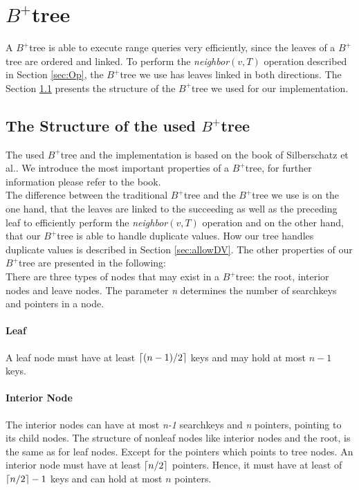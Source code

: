 \documentclass[abstracton,12pt]{scrreprt}
\DeclarePairedDelimiter\ceil{\lceil}{\rceil}
\begin{document}
\newpage
\section{$B^+$tree}
\label{sec:BplusTree}
A $B^+$tree is able to execute range queries very efficiently, since the leaves of a $B^+$tree are ordered and linked. To perform the \emph{neighbor}$(v,T)$ operation described in Section \ref{sec:Op}, the $B^+$tree we use has leaves linked in both directions. The Section \ref{structureBtree} presents the structure of the $B^+$tree we used for our implementation.

\subsection{The Structure of the used $B^+$tree}
\label{structureBtree}
The used $B^+$tree and the implementation is based on the book of Silberschatz et al.\cite{DatabaseSystemC}. We introduce the most important properties of a $B^+$tree, for further information please refer to the book.\\
The difference between the traditional $B^+$tree and the $B^+$tree we use is on the one hand, that the leaves are linked to the succeeding as well as the preceding leaf to efficiently perform the \emph{neighbor}$(v,T)$ operation and on the other hand, that our $B^+$tree is able to handle duplicate values. How our tree handles duplicate values is described in Section \ref{sec:allowDV}. The other properties of our $B^+$tree are presented in the following:\\
There are three types of nodes that may exist in a $B^+$tree: the root, interior nodes and leave nodes. The parameter \emph{n} determines the number of searchkeys and pointers in a node.

\paragraph{Leaf}
A leaf node must have at least $\ceil{(n-1)/2}$ keys and may hold at most $n-1$ keys.
\paragraph{Interior Node}
The interior nodes can have at most \emph{n-1} searchkeys and \emph{n} pointers, pointing to its child nodes. The structure of nonleaf nodes like interior nodes and the root, is the same as for leaf nodes. Except for the pointers which points to tree nodes. An interior node must have at least $\ceil{n/2}$ pointers. Hence, it must have at least of $\ceil{n/2}-1$ keys and can hold at most $n$ pointers.
\end{document}
